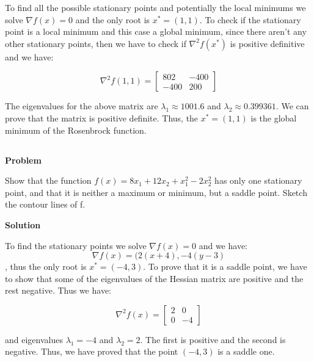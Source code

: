 \documentclass[a4paper,11pt]{article}
\numberwithin{equation}{section} %
\begin{document}
To find all the possible stationary points and potentially the local minimums we solve $\nabla f(x) =0$ and the only root is $x^{*} = (1,1)$. To check if the stationary point is a local minimum and this case a global minimum, since there aren't any other stationary points, then we have to check if $\nabla^2 f(x^{*})$ is positive definitive and we have:

\begin{equation}
    \nabla^2 f(1,1) = 
    \begin{bmatrix}
        802 & -400 \\
        -400 & 200
    \end{bmatrix}
\end{equation}

The eigenvalues for the above matrix are $\lambda_1 \approx 1001.6$ and $\lambda_2 \approx 0.399361$. We can prove that the matrix is positive definite. Thus, the $x^{*} = (1,1)$ is the global minimum of the Rosenbrock function.

\subsection{}

\textbf{Problem}

Show that the function $f(x) = 8x_1 + 12x_2 + x_1^2 - 2x_2^2$ has only one stationary
point, and that it is neither a maximum or minimum, but a saddle point. Sketch the contour
lines of f.

\textbf{Solution}


To find the stationary points we solve $\nabla f(x) = 0$ and we have:
\begin{equation}
    \nabla f(x) = (2(x+4), -4(y-3)
\end{equation}
, thus the only root is $x^{*} = (-4, 3)$. To prove that it is a saddle point, we have to show that some of the eigenvalues of the Hessian matrix are positive and the rest negative. Thus we have:

\begin{equation}
    \nabla^2 f(x) = 
    \begin{bmatrix}
        2 & 0 \\
        0 & -4
    \end{bmatrix}
\end{equation}

and eigenvalues $\lambda_1 = -4$ and $\lambda_2 = 2$. The first is positive and the second is negative. Thus, we have proved that the point $(-4, 3)$ is a saddle one.
\end{document}
